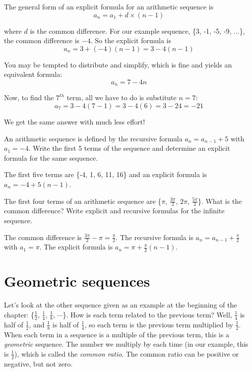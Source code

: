 The general form of an explicit formula for an arithmetic sequence is 
$$a_n = a_1 + d \times (n-1)$$

where $d$ is the common difference. For our example sequence, \{3, -1, 
-5, -9, ...\}, the common difference is $-4$. So the explicit formula 
is
$$a_n = 3 + (-4)(n-1) = 3 - 4(n-1)$$

You may be tempted to distribute and simplify, which is fine and 
yields an equivalent formula:
$$a_n = 7-4n$$

Now, to find the $7^{th}$ term, all we have to do is substitute $n=7$:
$$a_7 = 3 - 4(7 - 1) = 3 - 4(6) = 3 - 24 = -21$$

We get the same answer with much less effort!

\begin{Exercise}[label=seq2]
An arithmetic sequence is defined by the recursive formula $a_n = 
a_{n-1} + 5$ with $a_1 = -4$. Write the first 5 terms of the sequence 
and determine an explicit formula for the same sequence.
\end{Exercise}

\begin{Answer}[ref=seq2]
The first five terms are \{-4, 1, 6, 11, 16\} and an explicit formula 
is $a_n = -4 + 5(n-1)$. 
\end{Answer}

\begin{Exercise}[label=seq3]
The first four terms of an arithmetic sequence are \{$\pi$, 
$\frac{3\pi}{2}$, $2\pi$, $\frac{5\pi}{2}$\}. What is the common 
difference? Write explicit and recursive formulas for the infinite 
sequence.
\end{Exercise}

\begin{Answer}[ref=seq3]
The common difference is $\frac{3\pi}{2} - \pi = \frac{\pi}{2}$. The 
recursive formula is $a_n = a_{n-1} + \frac{\pi}{2}$ with $a_1 = \pi$. 
The explicit formula is $a_n = \pi + \frac{\pi}{2}(n-1)$. 
\end{Answer}


\section{Geometric sequences}
Let's look at the other sequence given as an example at the beginning 
of the chapter: \{$\frac{1}{2}$, $\frac{1}{4}$, $\frac{1}{8}$, 
$\cdots$\}. How is each term related to the previous term? Well, 
$\frac{1}{4}$ is half of $\frac{1}{2}$, and $\frac{1}{8}$ is half of 
$\frac{1}{4}$, so each term is the previous term multiplied by 
$\frac{1}{2}$. When each term in a sequence is a multiple of the 
previous term, this is a \textit{geometric} sequence. The number we 
multiply by each time (in our example, this is $\frac{1}{2}$), which is 
called the \textit{common ratio}. The common ratio can be positive 
or negative, but not zero. 

